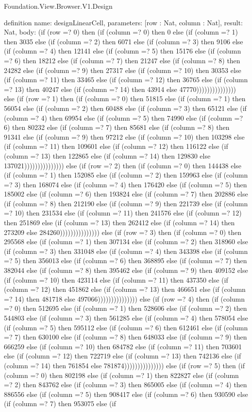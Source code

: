 \begin{lexlean}{Foundation.View.Browser.V1.Design}
\begin{semanticmodule}
definition{
  name: designLinearCell,
  parameters: [row : Nat, column : Nat],
  result: Nat,
  body: (if (row =? 0) then (if (column =? 0) then 0 else (if (column =? 1) then 3035 else (if (column =? 2) then 6071 else (if (column =? 3) then 9106 else (if (column =? 4) then 12141 else (if (column =? 5) then 15176 else (if (column =? 6) then 18212 else (if (column =? 7) then 21247 else (if (column =? 8) then 24282 else (if (column =? 9) then 27317 else (if (column =? 10) then 30353 else (if (column =? 11) then 33465 else (if (column =? 12) then 36765 else (if (column =? 13) then 40247 else (if (column =? 14) then 43914 else 47770))))))))))))))) else (if (row =? 1) then (if (column =? 0) then 51815 else (if (column =? 1) then 56054 else (if (column =? 2) then 60488 else (if (column =? 3) then 65121 else (if (column =? 4) then 69954 else (if (column =? 5) then 74990 else (if (column =? 6) then 80232 else (if (column =? 7) then 85681 else (if (column =? 8) then 91341 else (if (column =? 9) then 97212 else (if (column =? 10) then 103298 else (if (column =? 11) then 109601 else (if (column =? 12) then 116122 else (if (column =? 13) then 122865 else (if (column =? 14) then 129830 else 137021))))))))))))))) else (if (row =? 2) then (if (column =? 0) then 144438 else (if (column =? 1) then 152085 else (if (column =? 2) then 159963 else (if (column =? 3) then 168074 else (if (column =? 4) then 176420 else (if (column =? 5) then 185002 else (if (column =? 6) then 193824 else (if (column =? 7) then 202886 else (if (column =? 8) then 212190 else (if (column =? 9) then 221739 else (if (column =? 10) then 231534 else (if (column =? 11) then 241576 else (if (column =? 12) then 251869 else (if (column =? 13) then 262412 else (if (column =? 14) then 273209 else 284260))))))))))))))) else (if (row =? 3) then (if (column =? 0) then 295568 else (if (column =? 1) then 307134 else (if (column =? 2) then 318960 else (if (column =? 3) then 331048 else (if (column =? 4) then 343398 else (if (column =? 5) then 356013 else (if (column =? 6) then 368895 else (if (column =? 7) then 382044 else (if (column =? 8) then 395462 else (if (column =? 9) then 409152 else (if (column =? 10) then 423114 else (if (column =? 11) then 437350 else (if (column =? 12) then 451862 else (if (column =? 13) then 466651 else (if (column =? 14) then 481718 else 497066))))))))))))))) else (if (row =? 4) then (if (column =? 0) then 512695 else (if (column =? 1) then 528606 else (if (column =? 2) then 544803 else (if (column =? 3) then 561285 else (if (column =? 4) then 578054 else (if (column =? 5) then 595112 else (if (column =? 6) then 612461 else (if (column =? 7) then 630100 else (if (column =? 8) then 648033 else (if (column =? 9) then 666259 else (if (column =? 10) then 684782 else (if (column =? 11) then 703601 else (if (column =? 12) then 722719 else (if (column =? 13) then 742136 else (if (column =? 14) then 761854 else 781874))))))))))))))) else (if (row =? 5) then (if (column =? 0) then 802198 else (if (column =? 1) then 822827 else (if (column =? 2) then 843762 else (if (column =? 3) then 865005 else (if (column =? 4) then 886556 else (if (column =? 5) then 908417 else (if (column =? 6) then 930590 else (if (column =? 7) then 953075 else (if }
\end{semanticmodule}
\end{lexlean}
